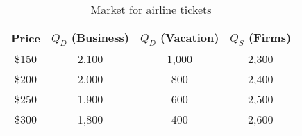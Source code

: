 \begin{table}
    \begin{tabular}{|c|c|c|c|}
      \hline
      \textbf{Price} & \textbf{$Q_D$ (Business)} & \textbf{$Q_D$ (Vacation)} & \textbf{$Q_S$ (Firms)} \\
      \hline
      \$150 & 2,100 & 1,000 & 2,300 \\
      \hline
      \$200 & 2,000 & 800   & 2,400 \\
      \hline
      \$250 & 1,900 & 600   & 2,500 \\
      \hline
      \$300 & 1,800 & 400   & 2,600 \\
      \hline
    \end{tabular}
    \caption{Market for airline tickets}
  \end{table}